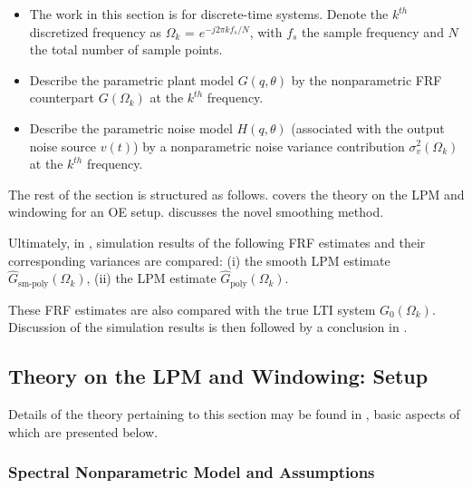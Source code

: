 \begin{itemize}

\item

The work in this section is for discrete-time systems. Denote the $k^{th}$ discretized frequency as $\Omega_k$ = $e^{-j2{\pi}kf_s/N}$, with $f_s$ the sample frequency and $N$ the total number of sample points.
\item

Describe the parametric plant model  $G(q,\theta)$ by the nonparametric \gls{FRF} counterpart  $G(\Omega_k)$  at the $k^{th}$ frequency.
\item

Describe  the parametric noise model $H(q,\theta)$ (associated with the output noise source $v(t)$) by a nonparametric noise variance contribution $\sigma^2_v(\Omega_k)$ at the $k^{th}$ frequency.

\end{itemize}

The rest of the section is structured as follows.  covers the theory on the \gls{LPM} and windowing for an \gls{OE} setup.
 discusses the novel smoothing method.



Ultimately, in , simulation results of the following FRF estimates and their corresponding variances are compared: (i) the smooth \gls{LPM} estimate $\hat{G}_\text{sm-poly}(\Omega_k)$, (ii) the \gls{LPM} estimate $\hat{G}_\text{poly}(\Omega_k)$.

These FRF estimates are also compared with the true \gls{LTI} system ${G}_0(\Omega_k)$.
Discussion of the simulation results is then followed by a conclusion in .

\subsection{Theory on the LPM and Windowing:  Setup}
\label{se:theoryLPMandWindowing}

Details of the theory pertaining to this section may be found in \citep{Schoukens2009LPM}, basic aspects of which are presented below.


\subsubsection{Spectral Nonparametric Model and Assumptions}

